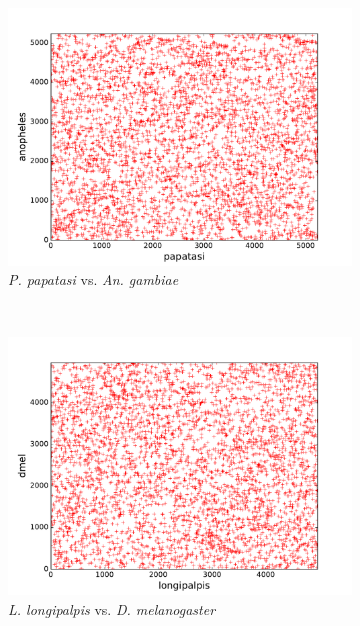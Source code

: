\begin{figure}[H]
  ~
  \begin{subfigure}[b]{0.45\textwidth}
    \includegraphics[width=\textwidth]{figures/synteny/papatasi_anopheles_plot}
    \caption{\emph{P. papatasi} vs. \emph{An. gambiae}}
    \label{fig:synteny-dotplots-papatasi-anopheles}
  \end{subfigure}
  ~
  \begin{subfigure}[b]{0.45\textwidth}
    \includegraphics[width=\textwidth]{figures/synteny/longipalpis_dmel_plot}
    \caption{\emph{L. longipalpis} vs. \emph{D. melanogaster}}
    \label{fig:synteny-dotplots-longipalpis-dmel}
  \end{subfigure}
  ~
  \begin{subfigure}[b]{0.45\textwidth}

\end{subfigure}
\end{figure}
